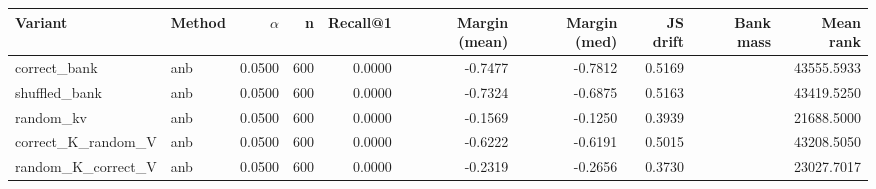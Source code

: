 \begin{tabular}{l l r r r r r r r r}
\toprule
Variant & Method & $\alpha$ & n & Recall@1 & Margin (mean) & Margin (med) & JS drift & Bank mass & Mean rank \\
\midrule
correct\_bank & anb & 0.0500 & 600 & 0.0000 & -0.7477 & -0.7812 & 0.5169 &  & 43555.5933 \\
shuffled\_bank & anb & 0.0500 & 600 & 0.0000 & -0.7324 & -0.6875 & 0.5163 &  & 43419.5250 \\
random\_kv & anb & 0.0500 & 600 & 0.0000 & -0.1569 & -0.1250 & 0.3939 &  & 21688.5000 \\
correct\_K\_random\_V & anb & 0.0500 & 600 & 0.0000 & -0.6222 & -0.6191 & 0.5015 &  & 43208.5050 \\
random\_K\_correct\_V & anb & 0.0500 & 600 & 0.0000 & -0.2319 & -0.2656 & 0.3730 &  & 23027.7017 \\
\bottomrule
\end{tabular}
